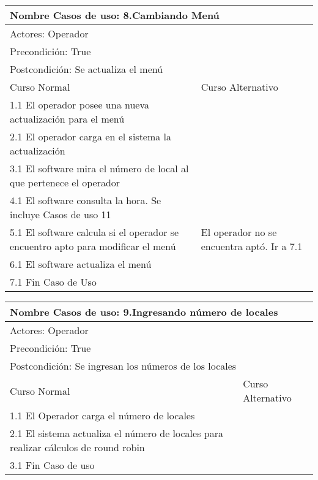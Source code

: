 \documentclass[a4paper,10pt]{article}
\begin{document}
\bigskip

\begin{center}
\begin{tabularx}{14cm}{|X|X|}
\hline
\multicolumn{2}{|l|}{Nombre Casos de uso: 8.Cambiando Men\'u}\\
\hline
\multicolumn{2}{|l|}{Actores: Operador}\\
\hline
\multicolumn{2}{|l|}{Precondici\'on: True}\\
\hline
\multicolumn{2}{|l|}{Postcondici\'on: Se actualiza el men\'u}\\
\hline
Curso Normal & Curso Alternativo\\
\hline
1.1 El operador posee una nueva actualizaci\'on para el men\'u & 
\\
\hline
2.1 El operador carga en el sistema la actualizaci\'on & 
\\
\hline
3.1 El software mira el n\'umero de local al que pertenece el operador &
\\
\hline
4.1 El software consulta la hora. Se incluye Casos de uso 11 &
\\
\hline
5.1 El software calcula si el operador se encuentro apto para modificar el men\'u & El operador no se encuentra apt\'o. Ir a 7.1
\\
\hline
6.1 El software actualiza el men\'u &
\\
\hline
7.1 Fin Caso de Uso &
\\
\hline
\end{tabularx}
\end{center}

\bigskip

\begin{center}
\begin{tabularx}{14cm}{|X|X|}
\hline
\multicolumn{2}{|l|}{Nombre Casos de uso: 9.Ingresando n\'umero de locales}\\
\hline
\multicolumn{2}{|l|}{Actores: Operador}\\
\hline
\multicolumn{2}{|l|}{Precondici\'on: True}\\
\hline
\multicolumn{2}{|l|}{Postcondici\'on: Se ingresan los n\'umeros de los locales}\\
\hline
Curso Normal & Curso Alternativo\\
\hline
1.1 El Operador carga el n\'umero de locales & 
\\
\hline
2.1 El sistema actualiza el n\'umero de locales para realizar c\'alculos de round robin & 
\\
\hline
3.1 Fin Caso de uso &
\\
\hline
\end{tabularx}
\end{center}
\end{document}
